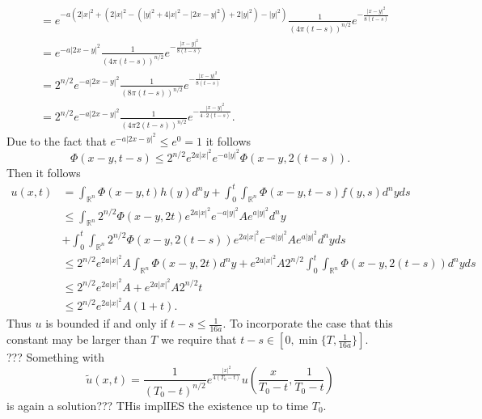 \documentclass[A4,12pt,twoside]{book}
\begin{document}
{\begin{align*}
         &= e^{- a\left(  2|x|^2+ ( 2|x|^2 - (|y|^2+ 4|x|^2 - |2x-y|^2)  +2|y|^2 ) -|y|^2 \right) } \frac{1}{(4 \pi (t-s))^{n/2}} e^{- \frac{|x-y|^2}{8(t-s)}} \\
         &= e^{- a |2x-y|^2 } \frac{1}{(4 \pi (t-s))^{n/2}} e^{- \frac{|x-y|^2}{8(t-s)}} \\
         &= 2^{n/2} e^{- a |2x-y|^2 } \frac{1}{(8 \pi (t-s))^{n/2}} e^{- \frac{|x-y|^2}{8(t-s)}}\\
        &= 2^{n/2} e^{- a |2x-y|^2 } \frac{1}{(4 \pi 2(t-s))^{n/2}} e^{- \frac{|x-y|^2}{4 \cdot 2(t-s)}}.
    \end{align*}
    Due to the fact that $e^{- a |2x-y|^2} \leq e^{0} =1$ it follows 
    \[
    \Phi (x-y, t-s) \leq 2^{n/2}  e^{2 a |x|^2} e^{-a|y|^2} \Phi (x-y,2(t-s)).
    \]
    Then it follows 
    \begin{align*}
        u(x,t) &= \int_{\mathbb{R}^n} \Phi (x-y ,t) h(y) d^n y + \int_0^t \int_{\mathbb{R}^n} \Phi (x-y,t-s) f(y,s) d^n y ds \\
        & \leq \int_{\mathbb{R}^n} 2^{n/2} \Phi (x-y,2t) e^{2 a |x|^2} e^{-a|y|^2} A e^{a |y|^2} d^n y \\
        &+ \int_0^t \int_{\mathbb{R}^n} 2^{n/2} \Phi (x-y,2(t-s)) e^{2 a |x|^2} e^{-a|y|^2} A e^{a |y|^2} d^n y ds \\
        &\leq  2^{n/2} e^{2 a |x|^2} A \int_{\mathbb{R}^n }\Phi (x-y,2t) d^n y +  e^{2 a |x|^2} A  2^{n/2}  \int_0^t \int_{\mathbb{R}^n} \Phi (x-y,2(t-s)) d^n y ds \\
        &\leq  2^{n/2} e^{2 a |x|^2} A  +  e^{2 a |x|^2} A  2^{n/2}  t \\
        &\leq  2^{n/2} e^{2 a |x|^2} A  (1+t).
    \end{align*}
    Thus $u$ is bounded if and only if $t-s \leq \frac{1}{16a}$. To incorporate the case that this constant may be larger than $T$ we require that $t -s \in [0, \min \{T,\frac{1}{16a}\}]$.\\
    ??? Something with 
    \[
    \tilde{u}(x,t) = \frac{1}{(T_0-t)^{n/2}} e^{\frac{|x|^2}{4(T_0-t)}} u(\frac{x}{T_0-t}, \frac{1}{T_0-t})
    \]
    is again a solution??? THis implIES the existence up to time $T_0$.
}
\end{document}
